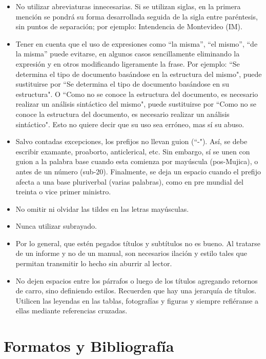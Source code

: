 \documentclass[conference]{IEEEtran}
\begin{document}
\begin{itemize}
	\item No utilizar abreviaturas innecesarias. Si se utilizan siglas, en la primera mención se pondrá su forma desarrollada seguida de la sigla entre paréntesis, sin puntos de separación; por ejemplo: Intendencia de Montevideo (IM).
	
	\item Tener en cuenta que el uso de expresiones como ``la misma'', ``el mismo'', ``de la misma'' puede evitarse, en algunos casos sencillamente eliminando la expresión y en otros modificando ligeramente la frase. Por ejemplo: ``Se determina el tipo de documento basándose en la estructura del mismo", puede sustituirse por ``Se determina el tipo de documento basándose en su estructura". O ``Como no se conoce la estructura del documento, es necesario realizar un análisis sintáctico del mismo", puede sustituirse por ``Como no se conoce la estructura del documento, es necesario realizar un análisis sintáctico". Esto no quiere decir que su uso sea erróneo, mas sí su abuso.
	
	\item Salvo contadas excepciones, los prefijos no llevan guion (``-"). Así, se debe escribir examante, proaborto, anticlerical, etc. Sin embargo, sí se unen con guion a la palabra base cuando esta comienza por mayúscula (pos-Mujica), o antes de un número (sub-20). Finalmente, se deja un espacio cuando el prefijo afecta a una base pluriverbal (varias palabras), como en pre mundial del treinta o vice primer ministro.
	
	\item No omitir ni olvidar las tildes en las letras mayúsculas.
	
	\item Nunca utilizar subrayado.
	
	\item Por lo general, que estén pegados títulos y subtítulos no es bueno. Al tratarse de un informe y no de un manual, son necesarios ilación y estilo tales que permitan transmitir lo hecho sin aburrir al lector.
	
	\item No dejen espacios entre los párrafos o luego de los títulos agregando retornos de carro, sino definiendo estilos. Recuerden que hay una jerarquía de títulos. Utilicen las leyendas en las tablas, fotografías y figuras y siempre refiéranse a ellas mediante referencias cruzadas. 
	
	
\end{itemize}


\section{Formatos y Bibliografía}
\label{formato}
\end{document}
